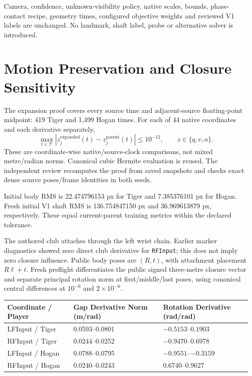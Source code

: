 \documentclass[11pt,letterpaper]{article}
\newcommand{\code}[1]{\nolinkurl{#1}}\newcommand{\hash}[1]{{\footnotesize\nolinkurl{#1}}}
\newcommand{\chapterpage}[1]{\par\clearpage\section{#1}}
\begin{document}
Camera, confidence, unknown-visibility policy, native scales, bounds, phase-contact recipe,
geometry times, configured objective weights and reviewed V1 labels are unchanged.
No landmark, shaft label, probe or alternative solver is introduced.
\chapterpage{Motion Preservation and Closure Sensitivity}
The expansion proof covers every source time and adjacent-source floating-point midpoint:
419 Tiger and 1,499 Hogan times. For each of 44 native coordinates and each derivative separately,
\[
\max_{t\in\mathcal T}|z_j^{\mathrm{expanded}}(t)-z_j^{\mathrm{parent}}(t)|
\leq10^{-12},\qquad z\in\{q,v,a\}.
\]
These are coordinate-wise native/source-clock comparisons, not mixed metre/radian norms.
Canonical cubic Hermite evaluation is reused. The independent review recomputes the proof
from saved snapshots and checks exact dense source poses/frame identities in both seeds.

Initial body RMS is 22.474796153 px for Tiger and 7.385376101 px for Hogan.
Fresh initial V1 shaft RMS is 136.754847150 px and 36.969613879 px, respectively.
These equal current-parent training metrics within the declared tolerance.

The authored club attaches through the left wrist chain. Earlier marker diagnostics showed
zero direct club derivative for \code{RFInput}; this does not imply zero closure influence.
Public body poses are $(R,t)$, with attachment placement $R\ell+t$.
Fresh preflight differentiates the public signed three-metre closure vector and separate
principal rotation norm at first/middle/last poses, using canonical central differences at
$10^{-6}$ and $2\times10^{-6}$.
\par\smallskip
\begin{tabular}{@{}p{.23\linewidth}p{.35\linewidth}p{.34\linewidth}@{}}\toprule
Coordinate / Player & Gap Derivative Norm (m/rad) & Rotation Derivative (rad/rad)\\\midrule
LFInput / Tiger & 0.0593--0.0801 & $-0.5153$--$0.1903$\\
RFInput / Tiger & 0.0244--0.0252 & $-0.9470$--$0.6978$\\
LFInput / Hogan & 0.0788--0.0795 & $-0.9551$--$-0.3159$\\
RFInput / Hogan & 0.0240--0.0243 & $0.6740$--$0.9627$\\\bottomrule
\end{tabular}\par\smallskip
\end{document}
